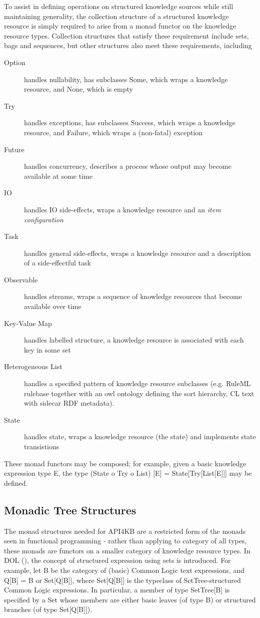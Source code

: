 \documentclass[runningheads]{llncs}
\begin{document}
To assist in defining operations on structured knowledge sources while still maintaining generality, the collection structure of a structured knowledge resource is simply required to arise from a monad functor on the knowledge resource types. Collection structures that satisfy these requirement include sets, bags and sequences, but other structures also meet these requirements, including
\begin{description}
\item [Option] handles nullability, has subclasses Some, which wraps a knowledge resource, and None, which is empty
\item [Try] handles exceptions, has subclasses Success, which wraps a knowledge resource, and Failure, which wraps a (non-fatal) exception
\item [Future] handles concurrency, describes a process whose output may become available at some time
\item [IO] handles IO side-effects, wraps a knowledge resource and an \emph{item configuration}
\item [Task] handles general side-effects, wraps a knowledge resource and a description of a side-effectful task
\item [Observable] handles streams, wraps a sequence of knowledge resources that become available over time
\item [Key-Value Map] handles labelled structure, a knowledge resource is associated with each key in some set
\item [Heterogeneous List] handles a specified pattern of knowledge resource subclasses (e.g. RuleML rulebase together with an owl ontology defining the sort hierarchy, CL text with sidecar RDF metadata).
\item [State] handles state, wraps a knowledge resource (the state) and implements state transistions
\end{description}
These monad functors may be composed; for example, given a basic knowledge expression type E, the type (State o Try o List) [E] = State[Try[List[E]]] may be defined.


\subsection{Monadic Tree Structures}
The monad structures needed for API4KB are a restricted form of the monads seen in functional programming - rather than applying to category of all types, these monads are functors on a smaller category of knowledge resource types. In DOL (), the concept of structured expression using sets is introduced. For example, let B be the category of (basic) Common Logic text expressions, and Q[B] = B or Set[Q[B]], where Set[Q[B]] is the typeclass of SetTree-structured Common Logic expressions. In particular, a member of type SetTree[B] is specified by a Set whose members are either  basic leaves (of type B) or structured branches (of type Set[Q[B]]). 
\end{document}
